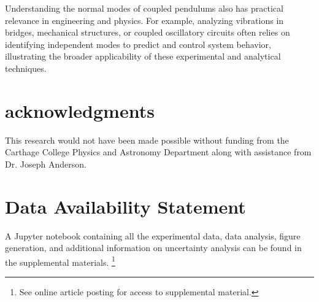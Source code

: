 \documentclass[reprint,amsmath,amssymb,aps,prb,footinbib,floatfix]{revtex4-2}
\begin{document}
Understanding the normal modes of coupled pendulums also has practical relevance in engineering and physics. For example, analyzing vibrations in bridges, mechanical structures, or coupled oscillatory circuits often relies on identifying independent modes to predict and control system behavior, illustrating the broader applicability of these experimental and analytical techniques.

\section*{acknowledgments}
This research would not have been made possible without funding from the Carthage College Physics and Astronomy Department along with assistance from Dr. Joseph Anderson.

\vspace{\fill}

\section*{Data Availability Statement}
A Jupyter notebook containing all the experimental data, data analysis, figure generation, and additional information on uncertainty analysis can be found in the supplemental materials. \footnote{See online article posting for access to supplemental material.}



\end{document}

